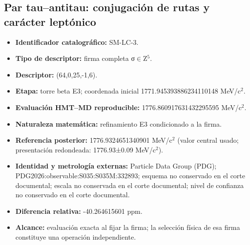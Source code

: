 \subsection{Par tau–antitau: conjugación de rutas y carácter leptónico}
\begin{itemize}
\item \textbf{Identificador catalográfico:} SM-LC-3.
\item \textbf{Tipo de descriptor:} firma completa σ\(\in\)Z\({}^{5}\).
\item \textbf{Descriptor:} (64,0,25,-1,6).
\item \textbf{Etapa:} torre beta E3; coordenada inicial 1771.945393\allowbreak{}886234\allowbreak{}110148 MeV/c\({}^{2}\).
\item \textbf{Evaluación HMT--MD reproducible:} 1776.860917\allowbreak{}631432\allowbreak{}295595 MeV/c\({}^{2}\).
\item \textbf{Naturaleza matemática:} refinamiento E3 condicionado a la firma.
\item \textbf{Referencia posterior:} 1776.932465\allowbreak{}134090\allowbreak{}1 MeV/c\({}^{2}\) (valor central usado; presentación redondeada: 1776.93±\allowbreak{}0.09 MeV/c\({}^{2}\)).
\item \textbf{Identidad y metrología externas:} Particle Data Group (PDG); PDG2026:\allowbreak{}observable:\allowbreak{}S035:\allowbreak{}S035M:\allowbreak{}332893; esquema no conservado en el corte documental; escala no conservada en el corte documental; nivel de confianza no conservado en el corte documental.
\item \textbf{Diferencia relativa:} -40.264615\allowbreak{}601 ppm.
\item \textbf{Alcance:} evaluación exacta al fijar la firma; la selección física de esa firma constituye una operación independiente.
\end{itemize}
